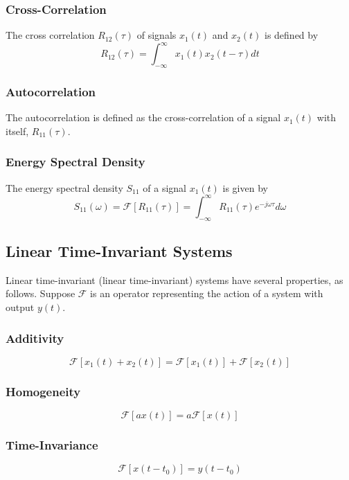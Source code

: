 \documentclass[]{article}
\begin{document}
\subsubsection{Cross-Correlation}
The cross correlation $R_{12}(\tau)$ of signals $x_{1}(t)$ and $x_{2}(t)$ is defined by
\begin{equation}R_{12}(\tau) = \int_{-\infty}^{\infty}x_{1}(t)x_{2}(t-\tau)dt\label{cross_corr_defn} \end{equation}
\subsubsection{Autocorrelation}
The autocorrelation is defined as the cross-correlation of a signal $x_{1}(t)$ with itself, $R_{11}(\tau)$.
\subsubsection{Energy Spectral Density}
The energy spectral density $S_{11}$ of a signal $x_{1}(t)$ is given by
\begin{equation}S_{11}(\omega) = \mathscr{F}[R_{11}(\tau)] = \int_{-\infty}^{\infty}R_{11}(\tau)e^{-j\omega \tau}d\omega\label{energy_spectral_density} \end{equation}
\subsection{Linear Time-Invariant Systems}
Linear time-invariant (linear time-invariant) systems have several properties, as follows. Suppose $\mathcal{F}$ is an operator representing the action of a system with output $y(t)$.
\subsubsection{Additivity}
\begin{equation}\mathcal{F}[x_{1}(t) +x_{2}(t)] = \mathcal{F}[x_{1}(t)] + \mathcal{F}[x_{2}(t)]\label{lti_additivity}\end{equation}
\subsubsection{Homogeneity}
\begin{equation}\mathcal{F}[ax(t)] = a\mathcal{F}[x(t)]\label{lti_homogeneity} \end{equation}
\subsubsection{Time-Invariance}
\begin{equation}\mathcal{F}[x(t-t_{0})] = y(t-t_{0})\label{lti_time_invariance} \end{equation}
\end{document}
